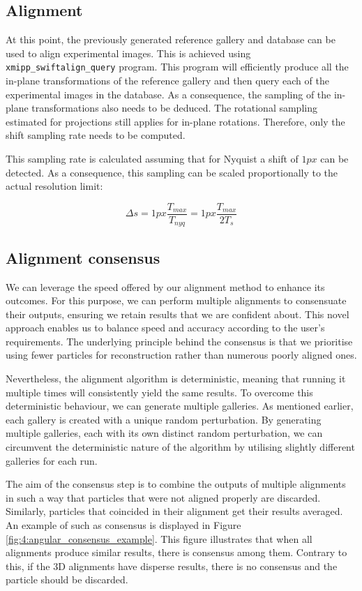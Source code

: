 \documentclass[../main.tex]{subfiles}
\begin{document}
\subsection{Alignment}
At this point, the previously generated reference gallery and database can be used to align experimental images. This is achieved using \texttt{xmipp\_swiftalign\_query} program. This program will efficiently produce all the in-plane transformations of the reference gallery and then query each of the experimental images in the database. As a consequence, the sampling of the in-plane transformations also needs to be deduced. The rotational sampling estimated for projections still applies for in-plane rotations. Therefore, only the shift sampling rate needs to be computed.

This sampling rate is calculated assuming that for Nyquist a shift of $1 \si{px}$ can be detected. As a consequence, this sampling can be scaled proportionally to the actual resolution limit:

\begin{equation}
    \Delta s = 1 \si{px} \frac{T_{max}}{T_{nyq}} = 1 \si{px} \frac{T_{max}}{2 T_{s}}
\end{equation}

\subsection{Alignment consensus}
We can leverage the speed offered by our alignment method to enhance its outcomes. For this purpose, we can perform multiple alignments to consensuate their outputs, ensuring we retain results that we are confident about. This novel approach enables us to balance speed and accuracy according to the user's requirements. The underlying principle behind the consensus is that we prioritise using fewer particles for reconstruction rather than numerous poorly aligned ones.

Nevertheless, the alignment algorithm is deterministic, meaning that running it multiple times will consistently yield the same results. To overcome this deterministic behaviour, we can generate multiple galleries. As mentioned earlier, each gallery is created with a unique random perturbation. By generating multiple galleries, each with its own distinct random perturbation, we can circumvent the deterministic nature of the algorithm by utilising slightly different galleries for each run.

The aim of the consensus step is to combine the outputs of multiple alignments in such a way that particles that were not aligned properly are discarded. Similarly, particles that coincided in their alignment get their results averaged. An example of such as consensus is displayed in Figure \ref{fig:4:angular_consensus_example}. This figure illustrates that when all alignments produce similar results, there is consensus among them. Contrary to this, if the 3D alignments have disperse results, there is no consensus and the particle should be discarded.
\end{document}
